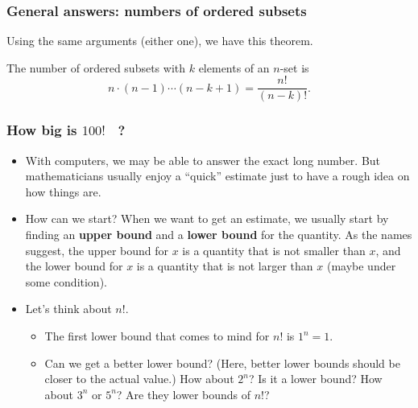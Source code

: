 \begin{frame}\frametitle{General answers: numbers of ordered subsets}
  Using the same arguments (either one), we have this theorem.

  \begin{theorem}
    The number of ordered subsets with $k$ elements of an $n$-set is
    \[
    n\cdot(n-1)\cdots(n - k + 1) = \frac{n!}{(n-k)!}.
    \]
  \end{theorem}
\end{frame}

\begin{frame}\frametitle{How big is $100!$ \ ?}
  \begin{itemize}
  \item
    With computers, we may be able to answer the exact long number.
    But mathematicians usually enjoy a ``quick'' estimate just to have
    a rough idea on how things are.

  \item
    How can we start? \pause When we want to get an estimate, we
    usually start by finding an {\bf upper bound} and a {\bf lower
      bound} for the quantity. \pause As the names suggest, the upper
    bound for $x$ is a quantity that is not smaller than $x$, and the
    lower bound for $x$ is a quantity that is not larger than $x$
    (maybe under some condition). \pause

  \item
    Let's think about $n!$.  \pause
    \begin{itemize}
    \item The first lower bound that comes to mind for $n!$ is $1^n =
      1$. \pause
    \item Can we get a better lower bound?  (Here, better lower bounds
      should be closer to the actual value.) \pause How about $2^n$?
      Is it a lower bound? \pause How about $3^n$ or $5^n$? Are they
      lower bounds of $n!$?
    \end{itemize}
  \end{itemize}
\end{frame}

